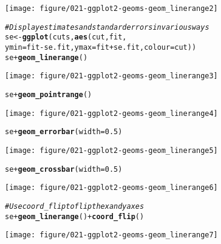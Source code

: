 \documentclass[a4paper,titlepage]{tufte-handout}\usepackage[]{graphicx}\usepackage[]{color}
\makeatletter
\def\maxwidth{ %
  \ifdim\Gin@nat@width>\linewidth
    \linewidth
  \else
    \Gin@nat@width
  \fi
}
\newcommand{\hlnum}[1]{\textcolor[rgb]{0.686,0.059,0.569}{#1}}%
\newcommand{\hlcom}[1]{\textcolor[rgb]{0.678,0.584,0.686}{\textit{#1}}}%
\newcommand{\hlopt}[1]{\textcolor[rgb]{0,0,0}{#1}}%
\newcommand{\hlstd}[1]{\textcolor[rgb]{0.345,0.345,0.345}{#1}}%
\newcommand{\hlkwb}[1]{\textcolor[rgb]{0.69,0.353,0.396}{#1}}%
\newcommand{\hlkwc}[1]{\textcolor[rgb]{0.333,0.667,0.333}{#1}}%
\newcommand{\hlkwd}[1]{\textcolor[rgb]{0.737,0.353,0.396}{\textbf{#1}}}%
\newenvironment{kframe}{%
 \def\at@end@of@kframe{}%
 \ifinner\ifhmode%
  \def\at@end@of@kframe{\end{minipage}}%
  \begin{minipage}{\columnwidth}%
 \fi\fi%
 \def\FrameCommand##1{\hskip\@totalleftmargin \hskip-\fboxsep
 \colorbox{shadecolor}{##1}\hskip-\fboxsep
     \hskip-\linewidth \hskip-\@totalleftmargin \hskip\columnwidth}%
 \MakeFramed {\advance\hsize-\width
   \@totalleftmargin\z@ \linewidth\hsize
   \@setminipage}}%
 {\par\unskip\endMakeFramed%
 \at@end@of@kframe}
\newenvironment{knitrout}{}{} %
\makeatother
\begin{document}
\begin{knitrout}
\begin{kframe}
{\ttfamily\noindent\itshape{}}\end{kframe}
\texttt{[image: figure/021-ggplot2-geoms-geom\_linerange2]} 
\begin{kframe}\begin{alltt}
\hlcom{# Display estimates and standard errors in various ways}
\hlstd{se} \hlkwb{<-} \hlkwd{ggplot}\hlstd{(cuts,} \hlkwd{aes}\hlstd{(cut, fit,}
  \hlkwc{ymin} \hlstd{= fit} \hlopt{-} \hlstd{se.fit,} \hlkwc{ymax}\hlstd{=fit} \hlopt{+} \hlstd{se.fit,} \hlkwc{colour} \hlstd{= cut))}
\hlstd{se} \hlopt{+} \hlkwd{geom_linerange}\hlstd{()}
\end{alltt}
\end{kframe}
\texttt{[image: figure/021-ggplot2-geoms-geom\_linerange3]} 
\begin{kframe}\begin{alltt}
\hlstd{se} \hlopt{+} \hlkwd{geom_pointrange}\hlstd{()}
\end{alltt}
\end{kframe}
\texttt{[image: figure/021-ggplot2-geoms-geom\_linerange4]} 
\begin{kframe}\begin{alltt}
\hlstd{se} \hlopt{+} \hlkwd{geom_errorbar}\hlstd{(}\hlkwc{width} \hlstd{=} \hlnum{0.5}\hlstd{)}
\end{alltt}
\end{kframe}
\texttt{[image: figure/021-ggplot2-geoms-geom\_linerange5]} 
\begin{kframe}\begin{alltt}
\hlstd{se} \hlopt{+} \hlkwd{geom_crossbar}\hlstd{(}\hlkwc{width} \hlstd{=} \hlnum{0.5}\hlstd{)}
\end{alltt}
\end{kframe}
\texttt{[image: figure/021-ggplot2-geoms-geom\_linerange6]} 
\begin{kframe}\begin{alltt}
\hlcom{# Use coord_flip to flip the x and y axes}
\hlstd{se} \hlopt{+} \hlkwd{geom_linerange}\hlstd{()} \hlopt{+} \hlkwd{coord_flip}\hlstd{()}
\end{alltt}
\end{kframe}
\texttt{[image: figure/021-ggplot2-geoms-geom\_linerange7]} 

\end{knitrout}
\end{document}
